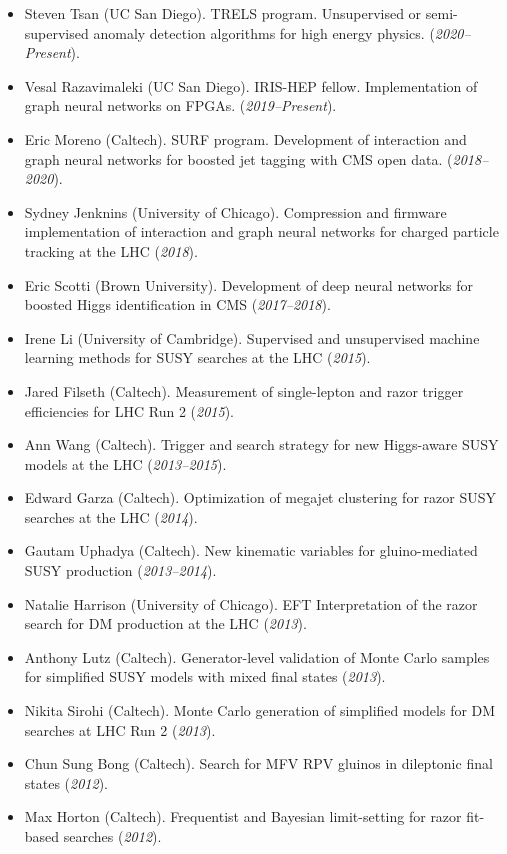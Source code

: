 \documentclass[11pt]{res}
\newif\ifext
\newenvironment{extended}{\ifext}{\fi}
\begin{document}
\begin{resume}
\begin{itemize}
    \item Steven Tsan (UC San Diego). TRELS program. Unsupervised or semi-supervised anomaly detection algorithms for high energy physics. (\textit{2020--Present}).
    \item Vesal Razavimaleki (UC San Diego). IRIS-HEP fellow. Implementation of graph neural networks on FPGAs. (\textit{2019--Present}).
    \item Eric Moreno (Caltech). SURF program. Development of interaction and graph neural networks for boosted jet tagging with CMS open data. (\textit{2018--2020}).
    \item Sydney Jenknins (University of Chicago). Compression and firmware implementation of interaction and graph neural networks for charged particle tracking at the LHC (\textit{2018}).
    \item Eric Scotti (Brown University). Development of deep neural networks for boosted Higgs identification in CMS (\textit{2017--2018}).
          \begin{extended}
            \item Irene Li (University of Cambridge). Supervised and unsupervised machine learning methods for SUSY searches at the LHC (\textit{2015}).
            \item Jared Filseth (Caltech). Measurement of single-lepton and razor trigger efficiencies for LHC Run 2 (\textit{2015}).
            \item Ann Wang (Caltech). Trigger and search strategy for new Higgs-aware SUSY models at the LHC (\textit{2013--2015}).
            \item Edward Garza (Caltech). Optimization of megajet clustering for razor SUSY searches at the LHC (\textit{2014}).
            \item Gautam Uphadya (Caltech). New kinematic variables for gluino-mediated SUSY production (\textit{2013--2014}).
            \item Natalie Harrison (University of Chicago). EFT Interpretation of the razor search for DM production at the LHC (\textit{2013}).
            \item Anthony Lutz (Caltech). Generator-level validation of Monte Carlo samples for simplified SUSY models with mixed final states (\textit{2013}).
            \item Nikita Sirohi (Caltech). Monte Carlo generation of simplified models for DM searches at LHC Run 2 (\textit{2013}).
            \item Chun Sung Bong (Caltech). Search for MFV RPV gluinos in dileptonic final states (\textit{2012}).
            \item Max Horton (Caltech). Frequentist and Bayesian limit-setting for razor fit-based searches (\textit{2012}).
          \end{extended}
  \end{itemize}



\end{resume}
\end{document}
